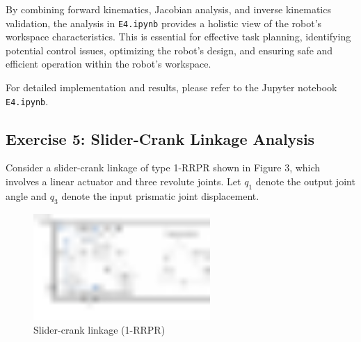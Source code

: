 \begin{solution}
By combining forward kinematics, Jacobian analysis, and inverse kinematics validation, the analysis in \texttt{E4.ipynb} provides a holistic view of the robot's workspace characteristics. This is essential for effective task planning, identifying potential control issues, optimizing the robot's design, and ensuring safe and efficient operation within the robot's workspace.

For detailed implementation and results, please refer to the Jupyter notebook \texttt{E4.ipynb}.
\end{solution}

\subsection{Exercise 5: Slider-Crank Linkage Analysis}

Consider a slider-crank linkage of type 1-RRPR shown in Figure 3, which involves a linear actuator and three revolute joints. Let $q_1$ denote the output joint angle and $q_3$ denote the input prismatic joint displacement.

 \begin{figure}[h]
 	\centering
 	\includegraphics[width=0.6\textwidth]{slider_crank_linkage.pdf}
 	\caption{Slider-crank linkage (1-RRPR)}
 	\label{fig:slider_crank}
 \end{figure}






